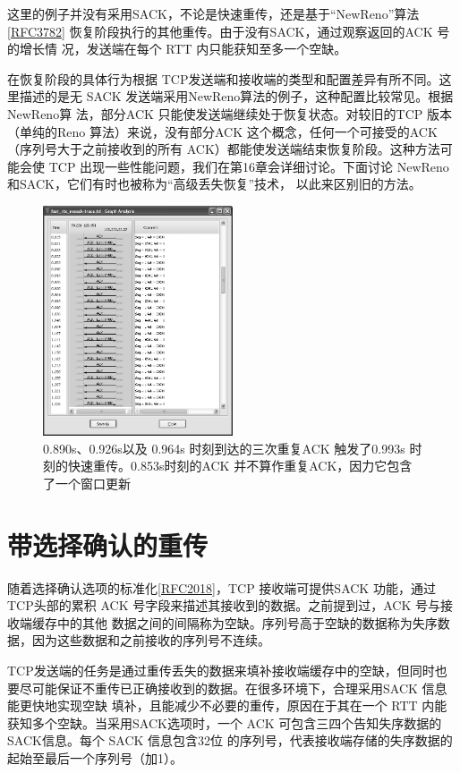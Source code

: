 这里的例子并没有采用SACK，不论是快速重传，还是基于“NewReno”算法\href{https://www.rfc-editor.org/rfc/rfc3782}{[RFC3782]} 恢复阶段执行的其他重传。由于没有SACK，通过观察返回的ACK 号的增长情
况，发送端在每个 RTT 内只能获知至多一个空缺。

在恢复阶段的具体行为根据 TCP发送端和接收端的类型和配置差异有所不同。这里描述的是无 SACK 发送端采用NewReno算法的例子，这种配置比较常见。根据NewReno算
法，部分ACK 只能使发送端继续处于恢复状态。对较旧的TCP 版本（单纯的Reno 算法）来说，没有部分ACK 这个概念，任何一个可接受的ACK（序列号大于之前接收到的所有
ACK）都能使发送端结束恢复阶段。这种方法可能会使 TCP 出现一些性能问题，我们在第16章会详细讨论。下面讨论 NewReno和SACK，它们有时也被称为“高级丢失恢复”技术，
以此来区别旧的方法。
\begin{figure}[!htb]
    \centering
	\includegraphics[width=0.5\textwidth]{imgs/14/14-8.png}
	\caption{0.890s、0.926s以及 0.964s 时刻到达的三次重复ACK 触发了0.993s 时刻的快速重传。0.853s时刻的ACK 并不算作重复ACK，因力它包含了一个窗口更新}
\end{figure}

\section{带选择确认的重传}

随着选择确认选项的标准化\href{https://www.rfc-editor.org/rfc/rfc2018}{[RFC2018]}，TCP 接收端可提供SACK 功能，通过TCP头部的累积 ACK 号字段来描述其接收到的数据。之前提到过，ACK 号与接收端缓存中的其他
数据之间的间隔称为空缺。序列号高于空缺的数据称为失序数据，因为这些数据和之前接收的序列号不连续。

TCP发送端的任务是通过重传丢失的数据来填补接收端缓存中的空缺，但同时也要尽可能保证不重传已正确接收到的数据。在很多环境下，合理采用SACK 信息能更快地实现空缺
填补，且能减少不必要的重传，原因在于其在一个 RTT 内能获知多个空缺。当采用SACK选项时，一个 ACK 可包含三四个告知失序数据的SACK信息。每个 SACK 信息包含32位
的序列号，代表接收端存储的失序数据的起始至最后一个序列号（加1）。

